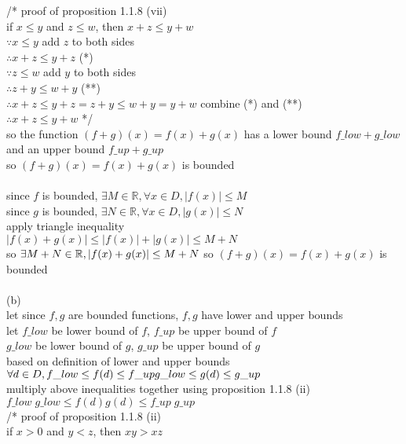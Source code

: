 \documentclass[12pt, border = 4pt, multi]{article} %
\begin{document}
/* proof of proposition 1.1.8 (vii)\\
if $x \leq y$ and $z \leq w$, then $x + z \leq y + w$\\
$\because x \leq y$ \qquad add $z$ to both sides\\
$\therefore x + z \leq y + z$ \qquad (*)\\
$\because z \leq w$ \qquad add $y$ to both sides\\
$\therefore z + y \leq w + y$ \qquad (**)\\
$\therefore x + z \leq y + z = z + y \leq w + y = y + w$ \qquad combine (*) and (**)\\ 
$\therefore x + z \leq y + w$ */\\
so the function $(f + g)(x) = f(x) + g(x)$ has a lower bound $f\_low + g\_low$ and an upper bound $f\_up + g\_up$\\
so $(f + g)(x) = f(x) + g(x)$ is bounded\\
\\
since $f$ is bounded, $\exists M \in \mathbb{R}, \forall x \in D, |f(x)| \leq M$\\
since $g$ is bounded, $\exists N \in \mathbb{R}, \forall x \in D, |g(x)| \leq N$\\
apply triangle inequality\\
$|f(x) + g(x)| \leq |f(x)| + |g(x)| \leq M + N$\\
so $\exists M + N \in \mathbb{R}, |f(x) + g(x)| \leq M + N\\$
so $(f + g)(x) = f(x) + g(x)$ is bounded\\
\\
(b)\\
let since $f, g$ are bounded functions, $f, g$ have lower and upper bounds\\
let $f\_low$ be lower bound of $f$, $f\_up$ be upper bound of $f$\\
$g\_low$ be lower bound of $g$, $g\_up$ be upper bound of $g$\\
based on definition of lower and upper bounds\\
$\forall d \in D, f\_low \leq f(d) \leq f\_up\\
g\_low \leq g(d) \leq g\_up$\\
multiply above inequalities together using proposition 1.1.8 (ii)\\
$f\_low\;g\_low\leq f(d) g(d) \leq f\_up\;g\_up$\\
/* proof of proposition 1.1.8 (ii)\\
if $x > 0$ and $y < z$, then $xy > xz$\\
\end{document}
